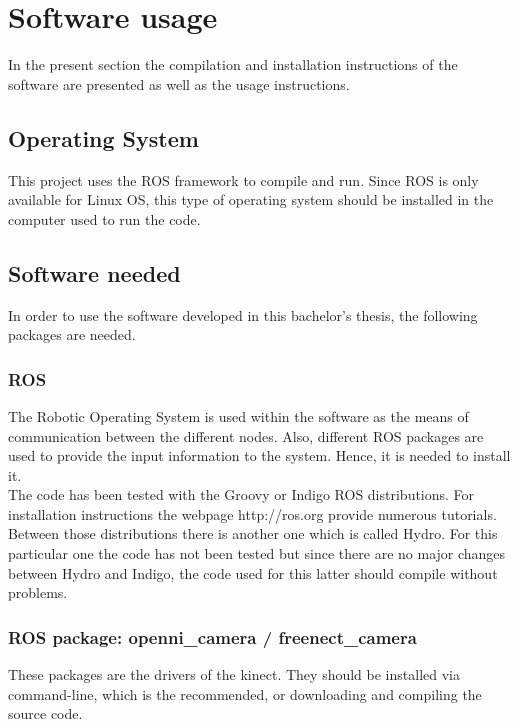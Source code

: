 \section{Software usage}
\label{software_usage}

In the present section the compilation and installation instructions of the software are presented as well as the usage instructions. 

\subsection{Operating System}
This project uses the ROS framework to compile and run. Since ROS is only available for Linux OS, this type of operating system should be installed in the computer used to run the code. 


\subsection{Software needed}
In order to use the software developed in this bachelor's thesis, the following packages are needed. 
\subsubsection{ROS}
The Robotic Operating System is used within the software as the means of communication between the different nodes. Also, different ROS packages are used to provide the input information to the system. Hence, it is needed to install it. 
\\

The code has been tested with the Groovy or Indigo ROS distributions. For installation instructions the webpage http://ros.org provide numerous tutorials. 
\\

Between those distributions there is another one which is called Hydro. For this particular one the code has not been tested but since there are no major changes between Hydro and Indigo, the code used for this latter should compile without problems. 


\subsubsection{ROS package: openni\_camera / freenect\_camera}
These packages are the drivers of the kinect. They should be installed via command-line, which is the recommended, or downloading and compiling the source code. 
\\

